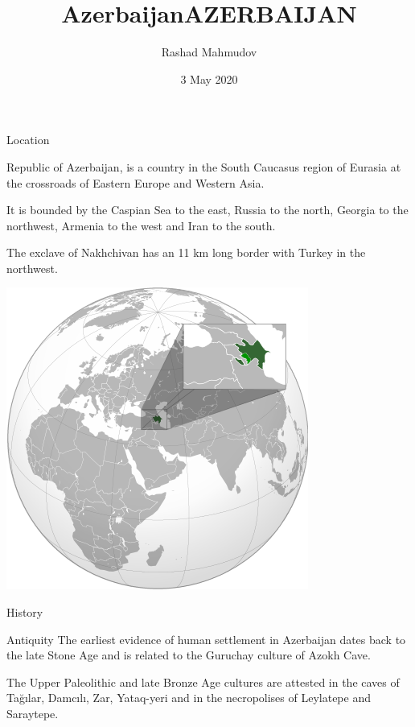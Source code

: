 \documentclass[hyperref={pdfpagemode=FullScreen}]{beamer}
\title{Azerbaijan}
\title{AZERBAIJAN}
\author{Rashad Mahmudov}
\date{3 May 2020}
\begin{document}
\begin{frame}
\titlepage
\end{frame}

\setlength{\columnsep}{0.7cm}
\begin{frame}{Location}
\begin{multicols}{2}
\justifying Republic of Azerbaijan, is a country in the South Caucasus region of Eurasia at the crossroads of Eastern Europe and Western Asia. 

It is bounded by the Caspian Sea to the east, Russia to the north, Georgia to the northwest, Armenia to the west and Iran to the south. 

The exclave of Nakhchivan has an 11 km long border with Turkey in the northwest.

\includegraphics[scale=.42]{img/aze01.png}
\end{multicols}
\end{frame}


\begin{frame}{History}
\begin{alertblock}{Antiquity}
\justifying The earliest evidence of human settlement in  Azerbaijan dates back to the late Stone Age and is related to the Guruchay culture of Azokh Cave. 

The Upper Paleolithic and late Bronze Age cultures are attested in the caves of Tağılar, Damcılı, Zar, Yataq-yeri and in the necropolises of Leylatepe and Saraytepe.
\end{alertblock}
\end{frame}
\end{document}
